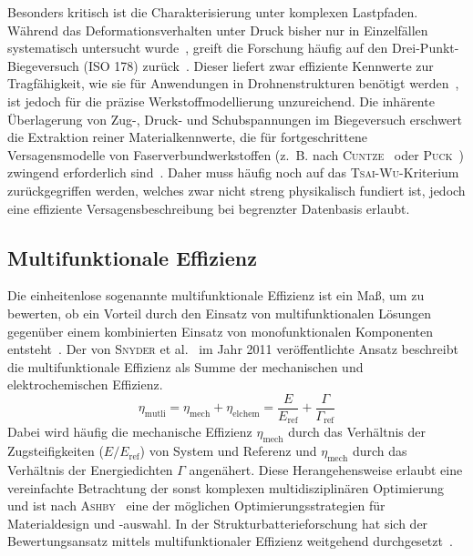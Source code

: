 Besonders kritisch ist die Charakterisierung unter komplexen Lastpfaden. Während das Deformationsverhalten unter Druck bisher nur in Einzelfällen systematisch untersucht wurde~\cite{Liu2022a, DiMauro2023}, greift die Forschung häufig auf den Drei-Punkt-Biegeversuch (ISO 178) zurück~\cite{AriefBudiman2022, Keshavarzi2022}. Dieser liefert zwar effiziente Kennwerte zur Tragfähigkeit, wie sie für Anwendungen in Drohnenstrukturen benötigt werden~\cite{Hollinger2019}, ist jedoch für die präzise Werkstoffmodellierung unzureichend. Die inhärente Überlagerung von Zug-, Druck- und Schubspannungen im Biegeversuch erschwert die Extraktion reiner Materialkennwerte, die für fortgeschrittene Versagensmodelle von Faserverbundwerkstoffen (z.~B. nach \textsc{Cuntze}~\cite{Cuntze2004} oder \textsc{Puck}~\cite{Puck2004}) zwingend erforderlich sind~\cite{Saba2019}. Daher muss häufig noch auf das \textsc{Tsai-Wu}-Kriterium~\cite{Tsai1971} zurückgegriffen werden, welches zwar nicht streng physikalisch fundiert ist, jedoch eine effiziente Versagensbeschreibung bei begrenzter Datenbasis erlaubt.

\subsection{Multifunktionale Effizienz}

Die einheitenlose sogenannte multifunktionale Effizienz ist ein Maß, um zu bewerten, ob ein Vorteil durch den Einsatz von multifunktionalen Lösungen gegenüber einem kombinierten Einsatz von monofunktionalen Komponenten entsteht~\cite{Johannisson2020}.
Der von \textsc{Snyder} et al.~\cite{Snyder2015} im Jahr 2011 veröffentlichte Ansatz beschreibt die multifunktionale Effizienz als Summe der mechanischen und elektrochemischen Effizienz.
\begin{equation}
	\eta_{\text{mutli}} = \eta_{\text{mech}} + \eta_{\text{elchem}}= \frac{E}{E_{\text{ref}}} + \frac{\Gamma}{\Gamma_\text{ref}} 
\end{equation}
Dabei wird häufig die mechanische Effizienz $\eta_{\text{mech}}$ durch das Verhältnis der Zugsteifigkeiten ($E/E_{\text{ref}}$) von System und Referenz und $\eta_{\text{mech}}$ durch das Verhältnis der Energiedichten $\Gamma$ angenähert.
Diese Herangehensweise erlaubt eine vereinfachte Betrachtung der sonst komplexen multidisziplinären Optimierung und ist nach \textsc{Ashby}~\cite{Ashby2000} eine der möglichen Optimierungsstrategien für Materialdesign und -auswahl. In der Strukturbatterieforschung hat sich der Bewertungsansatz mittels multifunktionaler Effizienz weitgehend durchgesetzt~\cite{O_Brien2011,Freund2018}.

